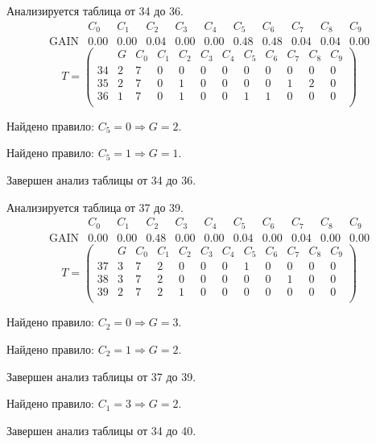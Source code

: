 Анализируется таблица от 34 до 36.
$$ 
\begin{array}{lccccc|c|cccc}
	  & C_{0} & C_{1} & C_{2} & C_{3} & C_{4} & C_{5} & C_{6} & C_{7} & C_{8} & C_{9}\\
 \textrm{GAIN} & 0.00 & 0.00 & 0.04 & 0.00 & 0.00 & 0.48 & 0.48 & 0.04 & 0.04 & 0.00
\end{array}
 $$
$$
T = \left( \begin{array}{lcccccc|c|cccc}
	 & G & C_{0} & C_{1} & C_{2} & C_{3} & C_{4} & C_{5} & C_{6} & C_{7} & C_{8} & C_{9}\\
	34 & 2 & 7 & 0 & 0 & 0 & 0 & 0 & 0 & 0 & 0 & 0\\
	35 & 2 & 7 & 0 & 1 & 0 & 0 & 0 & 0 & 1 & 2 & 0\\
	36 & 1 & 7 & 0 & 1 & 0 & 0 & 1 & 1 & 0 & 0 & 0\\
\end{array} \right)
$$

Найдено правило: $C_{5} = 0 \Longrightarrow G = 2$.

Найдено правило: $C_{5} = 1 \Longrightarrow G = 1$.

Завершен анализ таблицы от 34 до 36.

Анализируется таблица от 37 до 39.
$$ 
\begin{array}{lcc|c|ccccccc}
	  & C_{0} & C_{1} & C_{2} & C_{3} & C_{4} & C_{5} & C_{6} & C_{7} & C_{8} & C_{9}\\
 \textrm{GAIN} & 0.00 & 0.00 & 0.48 & 0.00 & 0.00 & 0.04 & 0.00 & 0.04 & 0.00 & 0.00
\end{array}
 $$
$$
T = \left( \begin{array}{lccc|c|ccccccc}
	 & G & C_{0} & C_{1} & C_{2} & C_{3} & C_{4} & C_{5} & C_{6} & C_{7} & C_{8} & C_{9}\\
	37 & 3 & 7 & 2 & 0 & 0 & 0 & 1 & 0 & 0 & 0 & 0\\
	38 & 3 & 7 & 2 & 0 & 0 & 0 & 0 & 0 & 1 & 0 & 0\\
	39 & 2 & 7 & 2 & 1 & 0 & 0 & 0 & 0 & 0 & 0 & 0\\
\end{array} \right)
$$

Найдено правило: $C_{2} = 0 \Longrightarrow G = 3$.

Найдено правило: $C_{2} = 1 \Longrightarrow G = 2$.

Завершен анализ таблицы от 37 до 39.

Найдено правило: $C_{1} = 3 \Longrightarrow G = 2$.

Завершен анализ таблицы от 34 до 40.

